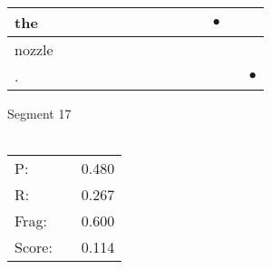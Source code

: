 \documentclass[landscape]{article}
\newcommand{\ssp}{\hspace{2pt}}
\newcommand{\mex}{\cellcolor{g}$\bullet$}
\begin{document}
\begin{tabular}{|l|p{10pt}|p{10pt}|p{10pt}|p{10pt}|p{10pt}|p{10pt}|p{10pt}|p{10pt}|p{10pt}|p{10pt}|p{10pt}|p{10pt}|p{10pt}|}
\hline
\ssp \cellcolor{ref10}the \ssp&\hspace{2pt}&\hspace{2pt}&\hspace{2pt}&\hspace{2pt}&\hspace{2pt}&\hspace{2pt}&\hspace{2pt}&\hspace{2pt}&\hspace{2pt}&\hspace{2pt}&\hspace{2pt}\mex&\hspace{2pt}&\hspace{2pt}\\
\hline
\ssp nozzle \ssp&\hspace{2pt}&\hspace{2pt}&\hspace{2pt}&\hspace{2pt}&\hspace{2pt}&\hspace{2pt}&\hspace{2pt}&\hspace{2pt}&\hspace{2pt}&\hspace{2pt}&\hspace{2pt}&\hspace{2pt}&\hspace{2pt}\\
\hline
\ssp \cellcolor{ref12}. \ssp&\hspace{2pt}&\hspace{2pt}&\hspace{2pt}&\hspace{2pt}&\hspace{2pt}&\hspace{2pt}&\hspace{2pt}&\hspace{2pt}&\hspace{2pt}&\hspace{2pt}&\hspace{2pt}&\hspace{2pt}&\hspace{2pt}\mex\\
\hline
\end{tabular}

\vspace{6pt}
\noindent Segment 17\\\\
\noindent\begin{tabular}{lm{12pt}r}
\hline
P:&&0.480\\
R:&&0.267\\
Frag:&&0.600\\
Score:&&0.114\\
\end{tabular}
\end{document}
